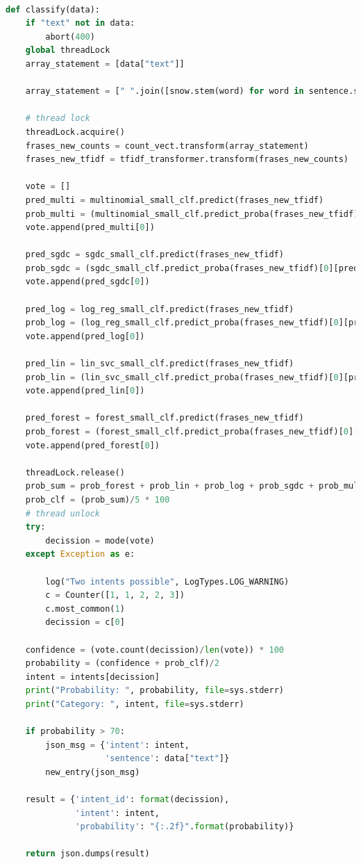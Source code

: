 \begin{lstlisting}[language=Python,caption={Classifier},captionpos=b]

def classify(data):
	if "text" not in data:
		abort(400)
	global threadLock
	array_statement = [data["text"]]

	array_statement = [" ".join([snow.stem(word) for word in sentence.split(" ")]) for sentence in array_statement]
	
	# thread lock
	threadLock.acquire()
	frases_new_counts = count_vect.transform(array_statement)
	frases_new_tfidf = tfidf_transformer.transform(frases_new_counts)
	
	vote = []
	pred_multi = multinomial_small_clf.predict(frases_new_tfidf)
	prob_multi = (multinomial_small_clf.predict_proba(frases_new_tfidf)[0][pred_multi[0]])
	vote.append(pred_multi[0])
	
	pred_sgdc = sgdc_small_clf.predict(frases_new_tfidf)
	prob_sgdc = (sgdc_small_clf.predict_proba(frases_new_tfidf)[0][pred_sgdc[0]])
	vote.append(pred_sgdc[0])
	
	pred_log = log_reg_small_clf.predict(frases_new_tfidf)
	prob_log = (log_reg_small_clf.predict_proba(frases_new_tfidf)[0][pred_log[0]])
	vote.append(pred_log[0])
	
	pred_lin = lin_svc_small_clf.predict(frases_new_tfidf)
	prob_lin = (lin_svc_small_clf.predict_proba(frases_new_tfidf)[0][pred_lin[0]])
	vote.append(pred_lin[0])
	
	pred_forest = forest_small_clf.predict(frases_new_tfidf)
	prob_forest = (forest_small_clf.predict_proba(frases_new_tfidf)[0][pred_forest[0]])
	vote.append(pred_forest[0])
	
	threadLock.release()
	prob_sum = prob_forest + prob_lin + prob_log + prob_sgdc + prob_multi
	prob_clf = (prob_sum)/5 * 100
	# thread unlock
	try:
		decission = mode(vote)
	except Exception as e:
	
		log("Two intents possible", LogTypes.LOG_WARNING)
		c = Counter([1, 1, 2, 2, 3])
		c.most_common(1)
		decission = c[0]
	
	confidence = (vote.count(decission)/len(vote)) * 100
	probability = (confidence + prob_clf)/2
	intent = intents[decission]
	print("Probability: ", probability, file=sys.stderr)
	print("Category: ", intent, file=sys.stderr)
	
	if probability > 70:
		json_msg = {'intent': intent,
					'sentence': data["text"]}
		new_entry(json_msg)
	
	result = {'intent_id': format(decission),
			  'intent': intent,
			  'probability': "{:.2f}".format(probability)}
	
	return json.dumps(result)


\end{lstlisting}

